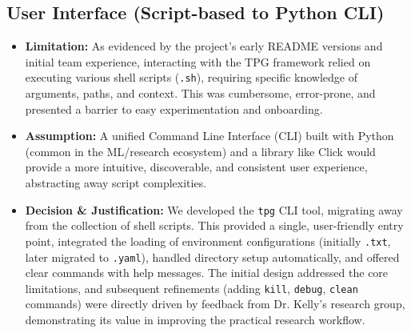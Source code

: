 \documentclass{article}
\begin{document}
\subsection{User Interface (Script-based to Python CLI)}
\begin{itemize}
    \item \textbf{Limitation:} As evidenced by the project's early README versions and initial team experience, interacting with the TPG framework relied on executing various shell scripts (\texttt{.sh}), requiring specific knowledge of arguments, paths, and context. This was cumbersome, error-prone, and presented a barrier to easy experimentation and onboarding.
    \item \textbf{Assumption:} A unified Command Line Interface (CLI) built with Python (common in the ML/research ecosystem) and a library like Click would provide a more intuitive, discoverable, and consistent user experience, abstracting away script complexities.
    \item \textbf{Decision \& Justification:} We developed the \texttt{tpg} CLI tool, migrating away from the collection of shell scripts. This provided a single, user-friendly entry point, integrated the loading of environment configurations (initially \texttt{.txt}, later migrated to \texttt{.yaml}), handled directory setup automatically, and offered clear commands with help messages. The initial design addressed the core limitations, and subsequent refinements (adding \texttt{kill}, \texttt{debug}, \texttt{clean} commands) were directly driven by feedback from Dr. Kelly's research group, demonstrating its value in improving the practical research workflow.
\end{itemize}
\end{document}
